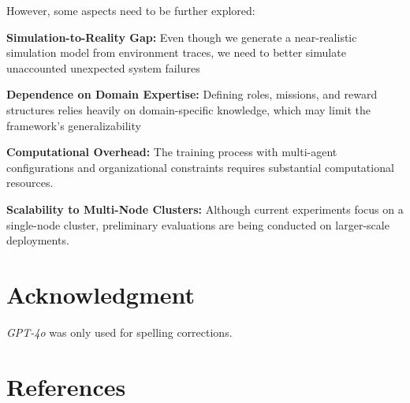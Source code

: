 \documentclass[conference]{IEEEtran}
\begin{document}
However, some aspects need to be further explored:
\begin{enumerate*}[label=\textbf{\arabic*)}, itemjoin={;\quad }]
    \item \textbf{Simulation-to-Reality Gap:} Even though we generate a near-realistic simulation model from environment traces, we need to better simulate unaccounted unexpected system failures
    \item \textbf{Dependence on Domain Expertise:} Defining roles, missions, and reward structures relies heavily on domain-specific knowledge, which may limit the framework's generalizability
    \item \textbf{Computational Overhead:} The training process with multi-agent configurations and organizational constraints requires substantial computational resources.
    \item \textbf{Scalability to Multi-Node Clusters:} Although current experiments focus on a single-node cluster, preliminary evaluations are being conducted on larger-scale deployments.

\end{enumerate*}




\section*{Acknowledgment}
\textit{GPT-4o} was only used for spelling corrections.


\section*{References}

% 


\end{document}
